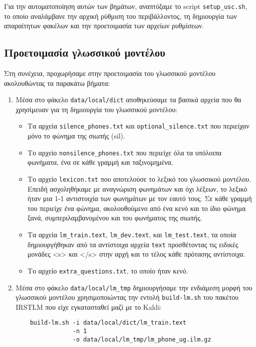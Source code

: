 \documentclass[a4paper,12pt]{article}
\begin{document}
Για την αυτοματοποίηση αυτών των βημάτων, αναπτύξαμε το script \verb|setup_usc.sh|, το οποίο αναλάμβανε την αρχική ρύθμιση του περιβάλλοντος, τη δημιουργία των απαραίτητων φακέλων και την προετοιμασία των αρχείων ρυθμίσεων.

\subsection{Προετοιμασία γλωσσικού μοντέλου}

Στη συνέχεια, προχωρήσαμε στην προετοιμασία του γλωσσικού μοντέλου ακολουθώντας τα παρακάτω βήματα:

\begin{enumerate}
    \item Μέσα στο φάκελο \verb|data/local/dict| αποθηκεύσαμε τα βασικά αρχεία που θα χρησίμευαν για τη δημιουργία του γλωσσικού μοντέλου:
    \begin{itemize}
        \item Τα αρχεία \verb|silence_phones.txt| και \verb|optional_silence.txt| που περιείχαν μόνο το φώνημα της σιωπής (sil).
        \item Το αρχείο \verb|nonsilence_phones.txt| που περιείχε όλα τα υπόλοιπα φωνήματα, ένα σε κάθε γραμμή και ταξινομημένα.
        \item Το αρχείο \verb|lexicon.txt| που αποτελούσε το λεξικό του γλωσσικού μοντέλου. Επειδή ασχοληθήκαμε με αναγνώριση φωνημάτων και όχι λέξεων, το λεξικό ήταν μια 1-1 αντιστοιχία των φωνημάτων με τον εαυτό τους. Σε κάθε γραμμή του περιείχε ένα φώνημα, ακολουθούμενο από ένα κενό και το ίδιο φώνημα ξανά, συμπεριλαμβανομένου και του φωνήματος της σιωπής.
        \item Τα αρχεία \verb|lm_train.text|, \verb|lm_dev.text|, και \verb|lm_test.text|, τα οποία δημιουργήθηκαν από τα αντίστοιχα αρχεία \verb|text| προσθέτοντας τις ειδικές μονάδες <s> και </s> στην αρχή και το τέλος κάθε πρότασης αντίστοιχα.
        \item Το αρχείο \verb|extra_questions.txt|, το οποίο ήταν κενό.
    \end{itemize}
    
    \item Μέσα στο φάκελο \verb|data/local/lm_tmp| δημιουργήσαμε την ενδιάμεση μορφή του γλωσσικού μοντέλου χρησιμοποιώντας την εντολή \verb|build-lm.sh| του πακέτου IRSTLM που είχε εγκατασταθεί μαζί με το Kaldi:
    
    \begin{lstlisting}
    build-lm.sh -i data/local/dict/lm_train.text 
                -n 1 
                -o data/local/lm_tmp/lm_phone_ug.ilm.gz
    

\end{lstlisting}
\end{enumerate}
\end{document}
